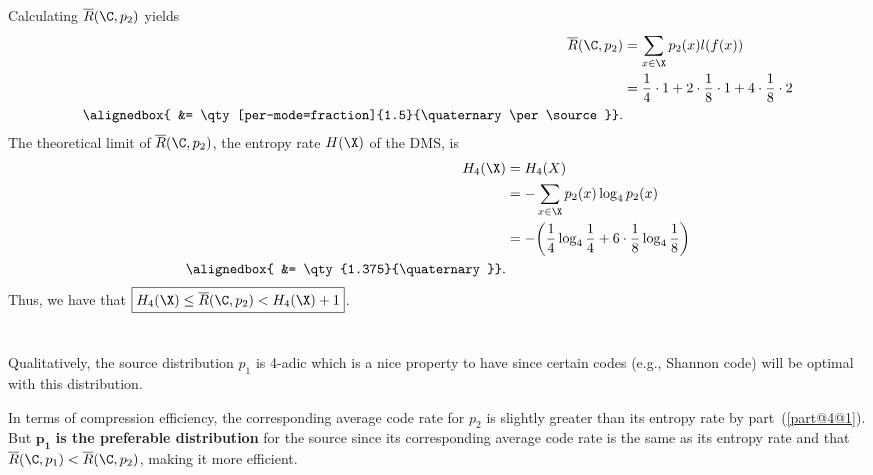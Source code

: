 \documentclass[
  coursecode={MTHE 474},
  assignmentname={Homework \homeworknumber},
  studentnumber=20053722,
  name={Bryan Hoang},
  draft,
]{
  ltxanswer%
}
\begin{document}
\begin{questions}
\begin{parts}
\begin{solution}
\begin{proofpart}
          Calculating \(\overline{R}(\C,p_{2})\) yields
          \begin{align*}
            \overline{R}(\C,p_{2}) &= \sum_{x\in\X} p_{2}(x)l(f(x))                                                   \\
                                   &= \frac{1}{4} \cdot 1 + 2 \cdot \frac{1}{8} \cdot 1 + 4 \cdot \frac{1}{8} \cdot 2 \\
            \alignedbox{           &= \qty[per-mode=fraction]{1.5}{\quaternary\per\source}}.
          \end{align*}
          The theoretical limit of \(\overline{R}(\C,p_{2})\), the entropy rate \(H(\X)\) of the DMS, is
          \begin{align*}
            H_{4}(\X)    &= H_{4}(X)                                                                             \\
                         &= -\sum_{x\in\X} p_{2}(x)\log_{4}p_{2}(x)                                              \\
                         &= -\biggl(\frac{1}{4}\log_{4}\frac{1}{4} + 6\cdot\frac{1}{8}\log_{4}\frac{1}{8}\biggr) \\
            \alignedbox{ &= \qty{1.375}{\quaternary}}.
          \end{align*}
          Thus, we have that \(\boxed{H_{4}(\X)\leq\overline{R}(\C,p_{2})<H_{4}(\X)+1}\).
        \end{proofpart}
      \end{solution}

      \part{}
      \begin{solution}
        Qualitatively, the source distribution \(p_{1}\) is 4-adic which is a nice property to have since certain codes (e.g., Shannon code) will be optimal with this distribution.

        In terms of compression efficiency, the corresponding average code rate for \(p_{2}\) is slightly greater than its entropy rate by part~(\ref{part@4@1}). But \(\bm{p_{1}}\) \textbf{is the preferable distribution} for the source since its corresponding average code rate is the same as its entropy rate and that \(\overline{R}(\C,p_{1})<\overline{R}(\C,p_{2})\), making it more efficient.
      \end{solution}
    \end{parts}
  \end{questions}
\end{document}
